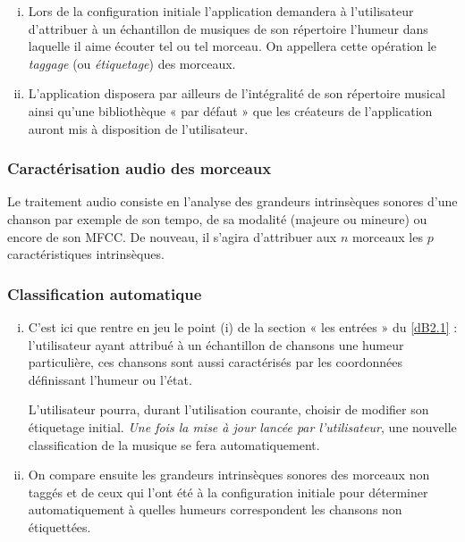 		\begin{enumerate}[(i)]
		\item Lors de la configuration initiale l’application demandera à l’utilisateur d’attribuer à un échantillon de musiques de son répertoire l’humeur dans laquelle il aime écouter tel ou tel morceau.
			On appellera cette opération le \emph{taggage} (ou \emph{étiquetage}) des morceaux.
		\item L’application disposera par ailleurs de l’intégralité de son répertoire musical ainsi qu’une bibliothèque « par défaut » que les créateurs de l’application auront mis à disposition de l’utilisateur.
		\end{enumerate}

	\subsubsection{Caractérisation audio des morceaux}
	\label{dB2.2}

		Le traitement audio consiste en l’analyse des grandeurs intrinsèques sonores d’une chanson par exemple de son tempo, de sa modalité (majeure ou mineure) ou encore de son MFCC.
		De nouveau, il s’agira d’attribuer aux $n$ morceaux les $p$ caractéristiques intrinsèques.

	\subsubsection{Classification automatique}
	\label{dB2.3}

		\begin{enumerate}[(i)]
		\item C’est ici que rentre en jeu le point (i) de la section « les entrées » du \ref{dB2.1} : l’utilisateur ayant attribué à un échantillon de chansons une humeur particulière, ces chansons sont aussi caractérisés par les coordonnées définissant l’humeur ou l’état.
			\begin{rem}
			L’utilisateur pourra, durant l’utilisation courante, choisir de modifier son étiquetage initial. \emph{Une fois la mise à jour lancée par l’utilisateur}, une nouvelle classification de la musique se fera automatiquement.
			\end{rem}
		\item On compare ensuite les grandeurs intrinsèques sonores des morceaux non taggés et de ceux qui l’ont été à la configuration initiale pour déterminer automatiquement à quelles humeurs correspondent les chansons non étiquettées.
		\end{enumerate}

